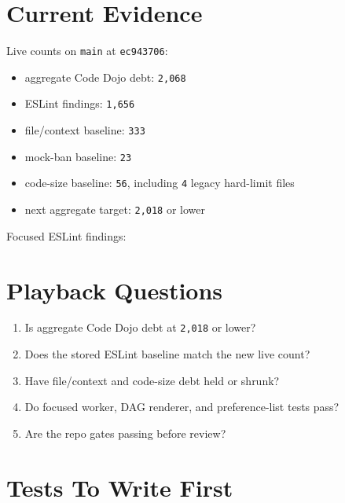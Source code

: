 \section{Current Evidence}\label{record-218-current-evidence}

Live counts on \texttt{m\allowbreak{}a\allowbreak{}i\allowbreak{}n} at \texttt{e\allowbreak{}c\allowbreak{}9\allowbreak{}4\allowbreak{}3\allowbreak{}7\allowbreak{}0\allowbreak{}6}:

\begin{itemize}
\tightlist
\item
  aggregate Code Dojo debt: \texttt{2\allowbreak{},\allowbreak{}0\allowbreak{}6\allowbreak{}8}
\item
  ESLint findings: \texttt{1\allowbreak{},\allowbreak{}6\allowbreak{}5\allowbreak{}6}
\item
  file/context baseline: \texttt{3\allowbreak{}3\allowbreak{}3}
\item
  mock-ban baseline: \texttt{2\allowbreak{}3}
\item
  code-size baseline: \texttt{5\allowbreak{}6}, including \texttt{4} legacy hard-limit files
\item
  next aggregate target: \texttt{2\allowbreak{},\allowbreak{}0\allowbreak{}1\allowbreak{}8} or lower
\end{itemize}

Focused ESLint findings:



\section{Playback Questions}\label{record-218-playback-questions}

\begin{enumerate}
\def\labelenumi{\arabic{enumi}.}
\tightlist
\item
  Is aggregate Code Dojo debt at \texttt{2\allowbreak{},\allowbreak{}0\allowbreak{}1\allowbreak{}8} or lower?
\item
  Does the stored ESLint baseline match the new live count?
\item
  Have file/context and code-size debt held or shrunk?
\item
  Do focused worker, DAG renderer, and preference-list tests pass?
\item
  Are the repo gates passing before review?
\end{enumerate}

\section{Tests To Write First}\label{record-218-tests-to-write-first}

